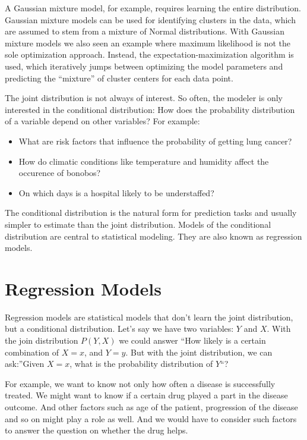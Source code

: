 \documentclass[
  10pt,
]{scrbook}
\providecommand{\tightlist}{%
  \setlength{\itemsep}{0pt}\setlength{\parskip}{0pt}}
\begin{document}
A Gaussian mixture model, for example, requires learning the entire distribution.
Gaussian mixture models can be used for identifying clusters in the data, which are assumed to stem from a mixture of Normal distributions.
With Gaussian mixture models we also seen an example where maximum likelihood is not the sole optimization approach.
Instead, the expectation-maximization algorithm is used, which iteratively jumps between optimizing the model parameters and predicting the ``mixture'' of cluster centers for each data point.

The joint distribution is not always of interest.
So often, the modeler is only interested in the conditional distribution:
How does the probability distribution of a variable depend on other variables?
For example:

\begin{itemize}
\tightlist
\item
  What are risk factors that influence the probability of getting lung cancer?
\item
  How do climatic conditions like temperature and humidity affect the occurence of bonobos?
\item
  On which days is a hospital likely to be understaffed?
\end{itemize}

The conditional distribution is the natural form for prediction tasks and usually simpler to estimate than the joint distribution.
Models of the conditional distribution are central to statistical modeling.
They are also known as regression models.

\hypertarget{regression-models}{%
\section{Regression Models}\label{regression-models}}

Regression models are statistical models that don't learn the joint distribution, but a conditional distribution.
Let's say we have two variables: \(Y\) and \(X\).
With the join distribution \(P(Y,X)\) we could answer ``How likely is a certain combination of \(X=x\), and \(Y=y\).
But with the joint distribution, we can ask:''Given \(X=x\), what is the probability distribution of \(Y\)``?

For example, we want to know not only how often a disease is successfully treated.
We might want to know if a certain drug played a part in the disease outcome.
And other factors such as age of the patient, progression of the disease and so on might play a role as well.
And we would have to consider such factors to answer the question on whether the drug helps.
\end{document}
